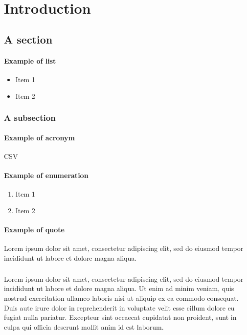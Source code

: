 
\chapter{Introduction}
\label{chp:intro}

\section{A section}

\subsubsection{Example of list}
\begin{itemize}
  \item Item 1
  \item Item 2
\end{itemize}

\subsection{A subsection}

\subsubsection{Example of acronym}
\ac{CSV}

\subsubsection{Example of enumeration}
\begin{enumerate}
  \item Item 1
  \item Item 2
\end{enumerate}

\subsubsection{Example of quote}
\begin{displayquote}
Lorem ipsum dolor sit amet, consectetur adipiscing elit, sed do eiusmod tempor incididunt ut labore et dolore magna aliqua.
\end{displayquote}

\paragraph{}
Lorem ipsum dolor sit amet, consectetur adipiscing elit, sed do eiusmod tempor incididunt ut labore et dolore magna aliqua. Ut enim ad minim veniam, quis nostrud exercitation ullamco laboris nisi ut aliquip ex ea commodo consequat. Duis aute irure dolor in reprehenderit in voluptate velit esse cillum dolore eu fugiat nulla pariatur. Excepteur sint occaecat cupidatat non proident, sunt in culpa qui officia deserunt mollit anim id est laborum.